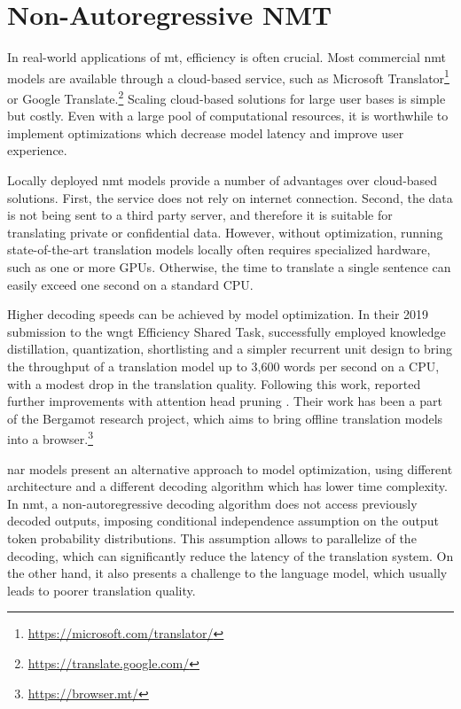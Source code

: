 \chapter{Non-Autoregressive NMT}
\label{chap:nat}

In real-world applications of \ac{mt}, efficiency is often crucial.  Most
commercial \ac{nmt} models are available through a cloud-based service, such as
Microsoft Translator\footnote{\url{https://microsoft.com/translator/}} or
Google Translate.\footnote{\url{https://translate.google.com/}} Scaling
cloud-based solutions for large user bases is simple but costly. Even with a
large pool of computational resources, it is worthwhile to implement
optimizations which decrease model latency and improve user experience.

Locally deployed \ac{nmt} models provide a number of advantages over
cloud-based solutions. First, the service does not rely on internet
connection. Second, the data is not being sent to a third party server, and
therefore it is suitable for translating private or confidential data.
However, without optimization, running state-of-the-art translation models
locally often requires specialized hardware, such as one or more
GPUs. Otherwise, the time to translate a single sentence can easily exceed one
second on a standard CPU.

Higher decoding speeds can be achieved by model optimization. In their 2019
submission to the \ac{wngt} Efficiency Shared Task,
\citet{kim-etal-2019-research} successfully employed knowledge distillation,
quantization, shortlisting \citep{jean-etal-2015-using} and a simpler recurrent
unit design to bring the throughput of a translation model up to 3,600 words
per second on a CPU, with a modest drop in the translation quality. Following
this work, \citet{bogoychev-etal-2020-edinburghs} reported further improvements
with attention head pruning \citep{voita-etal-2019-analyzing}. Their work has
been a part of the Bergamot research project, which aims to bring offline
translation models into a browser.\footnote{\url{https://browser.mt/}}

\Ac{nar} models present an alternative approach to model optimization, using
different architecture and a different decoding algorithm which has lower time
complexity.  In \ac{nmt}, a non-autoregressive decoding algorithm does not
access previously decoded outputs, imposing conditional independence
assumption on the output token probability distributions. This assumption
allows to parallelize of the decoding, which can significantly reduce the
latency of the translation system. On the other hand, it also presents a
challenge to the language model, which usually leads to poorer translation
quality.

